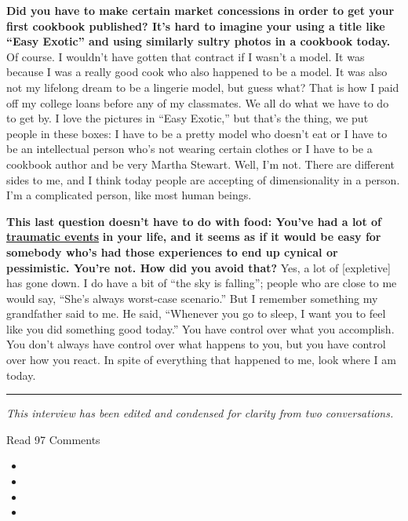 \textbf{Did you have to make certain market concessions in order to get
your first cookbook published? It's hard to imagine your using a title
like ``Easy Exotic'' and using similarly sultry photos in a cookbook
today.} Of course. I wouldn't have gotten that contract if I wasn't a
model. It was because I was a really good cook who also happened to be a
model. It was also not my lifelong dream to be a lingerie model, but
guess what? That is how I paid off my college loans before any of my
classmates. We all do what we have to do to get by. I love the pictures
in ``Easy Exotic,'' but that's the thing, we put people in these boxes:
I have to be a pretty model who doesn't eat or I have to be an
intellectual person who's not wearing certain clothes or I have to be a
cookbook author and be very Martha Stewart. Well, I'm not. There are
different sides to me, and I think today people are accepting of
dimensionality in a person. I'm a complicated person, like most human
beings.

\textbf{This last question doesn't have to do with food: You've had a
lot of}
\textbf{\href{http://nytimes3xbfgragh.onion\#tooltip-12}{traumatic
events}} \textbf{in your life, and it seems as if it would be easy for
somebody who's had those experiences to end up cynical or pessimistic.
You're not. How did you avoid that?} Yes, a lot of {[}expletive{]} has
gone down. I do have a bit of ``the sky is falling''; people who are
close to me would say, ``She's always worst-case scenario.'' But I
remember something my grandfather said to me. He said, ``Whenever you go
to sleep, I want you to feel like you did something good today.'' You
have control over what you accomplish. You don't always have control
over what happens to you, but you have control over how you react. In
spite of everything that happened to me, look where I am today.

\begin{center}\rule{0.5\linewidth}{\linethickness}\end{center}

\emph{This interview has been edited and condensed for clarity from two
conversations.}

Read 97 Comments

\begin{itemize}
\item
\item
\item
\item
\end{itemize}

